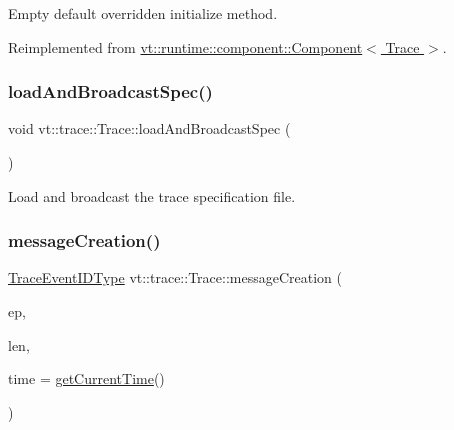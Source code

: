 Empty default overridden initialize method. 



Reimplemented from \hyperlink{structvt_1_1runtime_1_1component_1_1_component_a7f07384d294e59796add9ce6be2d6410}{vt\+::runtime\+::component\+::\+Component$<$ Trace $>$}.

\mbox{\label{structvt_1_1trace_1_1_trace_a06f74f8d2c0c2fb97be14a264fd36a45}} 
\subsubsection{\texorpdfstring{load\+And\+Broadcast\+Spec()}{loadAndBroadcastSpec()}}
{\footnotesize\ttfamily void vt\+::trace\+::\+Trace\+::load\+And\+Broadcast\+Spec (\begin{DoxyParamCaption}{ }\end{DoxyParamCaption})}



Load and broadcast the trace specification file. 

\mbox{\label{structvt_1_1trace_1_1_trace_a99d4161407df03e98a382987a4a44285}} 
\subsubsection{\texorpdfstring{message\+Creation()}{messageCreation()}}
{\footnotesize\ttfamily \hyperlink{namespacevt_1_1trace_a64a7185f3e102df8d8258f263ccd1582}{Trace\+Event\+I\+D\+Type} vt\+::trace\+::\+Trace\+::message\+Creation (\begin{DoxyParamCaption}\item[{\hyperlink{namespacevt_1_1trace_a3c14050715ba9eceaeff51fb3de64f2f}{Trace\+Entry\+I\+D\+Type} const}]{ep,  }\item[{\hyperlink{namespacevt_1_1trace_aeb598f45d67d41db7902e494f2f0ce59}{Trace\+Msg\+Len\+Type} const}]{len,  }\item[{\hyperlink{namespacevt_a2b9f28078dc309ad0706b69ded743e69}{Time\+Type} const}]{time = {\ttfamily \hyperlink{structvt_1_1trace_1_1_trace_lite_a5ddfc40d8206946d33630d4b81b6126c}{get\+Current\+Time}()} }\end{DoxyParamCaption})}



